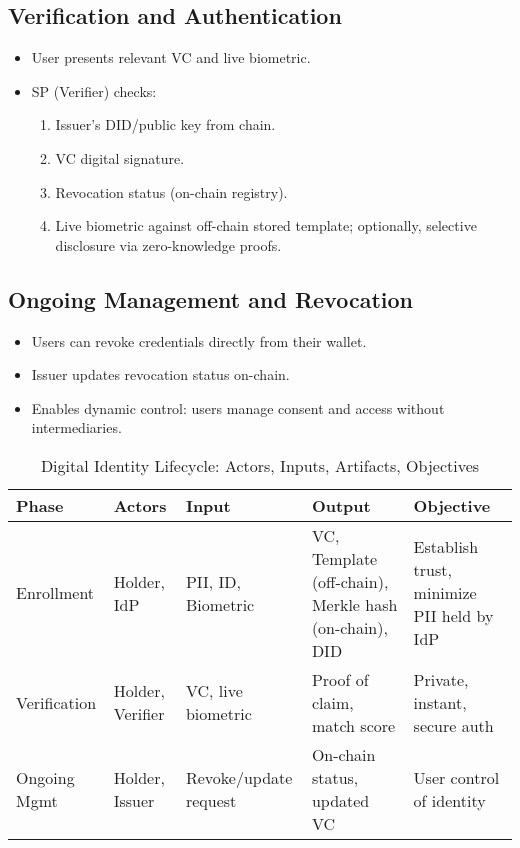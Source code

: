 \subsection{Verification and Authentication}
\begin{itemize}
    \item User presents relevant VC and live biometric.
    \item SP (Verifier) checks:
    \begin{enumerate}
        \item Issuer's DID/public key from chain.
        \item VC digital signature.
        \item Revocation status (on-chain registry).
        \item Live biometric against off-chain stored template; optionally, selective disclosure via zero-knowledge proofs.
    \end{enumerate}
\end{itemize}

\subsection{Ongoing Management and Revocation}
\begin{itemize}
    \item Users can revoke credentials directly from their wallet.
    \item Issuer updates revocation status on-chain.
    \item Enables dynamic control: users manage consent and access without intermediaries.
\end{itemize}

\begin{table}[h]
\centering
\caption{Digital Identity Lifecycle: Actors, Inputs, Artifacts, Objectives}
\begin{tabular}{|l|l|l|l|l|}
\hline
\textbf{Phase} & \textbf{Actors} & \textbf{Input} & \textbf{Output} & \textbf{Objective} \\
\hline
Enrollment & Holder, IdP & PII, ID, Biometric & VC, Template (off-chain), Merkle hash (on-chain), DID & Establish trust, minimize PII held by IdP \\
Verification & Holder, Verifier & VC, live biometric & Proof of claim, match score & Private, instant, secure auth \\
Ongoing Mgmt & Holder, Issuer & Revoke/update request & On-chain status, updated VC & User control of identity \\
\hline
\end{tabular}
\end{table}

